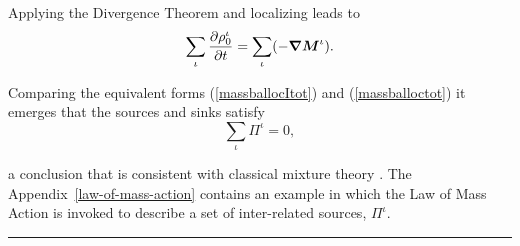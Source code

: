 \noindent Applying the Divergence Theorem and localizing leads to
\begin{equation}
\sum\limits_\iota \frac{\partial\rho_0^\iota}{\partial t} =
\sum\limits_\iota(-\mbox{\boldmath$\nabla$}\mbox{\boldmath$ M$}^\iota). \label{massballoctot}
\end{equation}

\noindent Comparing the equivalent forms (\ref{massballocItot})
and (\ref{massballoctot}) it emerges that the sources and sinks
satisfy
\begin{equation}
\sum\limits_\iota\Pi^\iota = 0, \label{sourcebalance}
\end{equation}

\noindent a conclusion that is consistent with classical mixture
theory \citep{TruesdellNoll:65}. The Appendix~\ref{law-of-mass-action}
contains an example in which the Law of Mass Action is invoked to
describe a set of inter-related sources, $\Pi^\iota$.

\hrule






